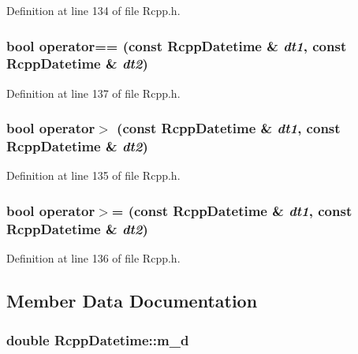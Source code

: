 Definition at line 134 of file Rcpp.h.\hypertarget{classRcppDatetime_ac6643666732e0a62c501da9f0ae9e342}{
\subsubsection[{operator==}]{\setlength{\rightskip}{0pt plus 5cm}bool operator== (const {\bf RcppDatetime} \& {\em dt1}, \/  const {\bf RcppDatetime} \& {\em dt2})}}
\label{classRcppDatetime_ac6643666732e0a62c501da9f0ae9e342}


Definition at line 137 of file Rcpp.h.\hypertarget{classRcppDatetime_a062107b2e2809a60c67f80da5dab77ed}{
\subsubsection[{operator$>$}]{\setlength{\rightskip}{0pt plus 5cm}bool operator$>$ (const {\bf RcppDatetime} \& {\em dt1}, \/  const {\bf RcppDatetime} \& {\em dt2})}}
\label{classRcppDatetime_a062107b2e2809a60c67f80da5dab77ed}


Definition at line 135 of file Rcpp.h.\hypertarget{classRcppDatetime_a1aac48969216af0555677a43b3617781}{
\subsubsection[{operator$>$=}]{\setlength{\rightskip}{0pt plus 5cm}bool operator$>$= (const {\bf RcppDatetime} \& {\em dt1}, \/  const {\bf RcppDatetime} \& {\em dt2})}}
\label{classRcppDatetime_a1aac48969216af0555677a43b3617781}


Definition at line 136 of file Rcpp.h.

\subsection{Member Data Documentation}
\hypertarget{classRcppDatetime_a1af187ff381bfa0f5b57d28b64d7b60c}{
\subsubsection[{m\_\-d}]{\setlength{\rightskip}{0pt plus 5cm}double {\bf RcppDatetime::m\_\-d}}}
\label{classRcppDatetime_a1af187ff381bfa0f5b57d28b64d7b60c}


